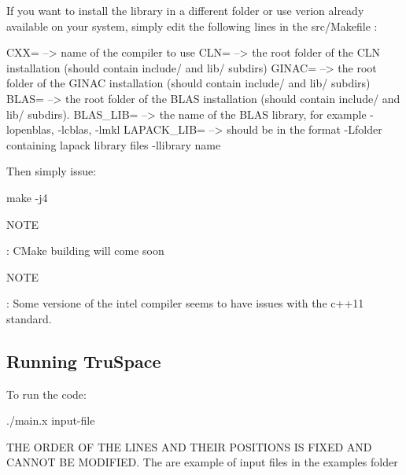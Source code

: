 If you want to install the library in a different folder or use verion already available on your system, simply edit the following lines in the {\ttfamily src/\+Makefile} \+: \begin{DoxyVerb}CXX=                          --> name of the compiler to use
CLN=                          --> the root folder of the CLN installation (should contain include/ and lib/ subdirs)
GINAC=                        --> the root folder of the GINAC installation (should contain include/ and lib/ subdirs)
BLAS=                         --> the root folder of the BLAS installation (should contain include/ and lib/ subdirs). 
BLAS_LIB=                     --> the name of the BLAS library, for example -lopenblas, -lcblas, -lmkl
LAPACK_LIB=                   --> should be in the format -L{folder containing lapack library files} -l{library name}
\end{DoxyVerb}


Then simply issue\+: \begin{DoxyVerb}make -j4
\end{DoxyVerb}


N\+O\+TE

\+: C\+Make building will come soon

N\+O\+TE

\+: Some versione of the intel compiler seems to have issues with the c++11 standard.

\subsection*{Running Tru\+Space }

To run the code\+: \begin{DoxyVerb}./main.x input-file
\end{DoxyVerb}


T\+HE O\+R\+D\+ER OF T\+HE L\+I\+N\+ES A\+ND T\+H\+E\+IR P\+O\+S\+I\+T\+I\+O\+NS IS F\+I\+X\+ED A\+ND C\+A\+N\+N\+OT BE M\+O\+D\+I\+F\+I\+ED. The are example of input files in the {\ttfamily examples} folder

